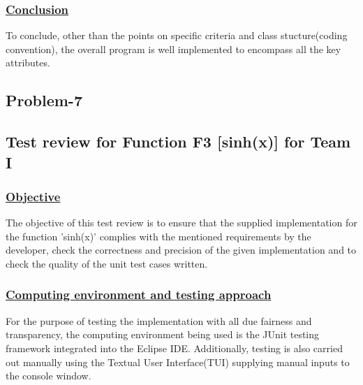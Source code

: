 \documentclass[12pt]{report}
\begin{document}
	\vspace{-0.5cm}\subsubsection{\underline{Conclusion}}To conclude, other than the points on specific criteria and class stucture(coding convention), the overall program is well implemented to encompass all the key attributes.

\begin{center}
	\section{Problem-7}
\end{center}

\subsection{Test review for Function F3 [sinh(x)] for Team I}
\subsubsection{\underline{Objective}}The objective of this test review is to ensure that the supplied implementation for the function 'sinh(x)' complies with the mentioned requirements by the developer, check the correctness and precision of the given implementation and to check the quality of the unit test cases written.
\subsubsection{\underline{Computing environment and testing approach}}For the purpose of testing the implementation with all due fairness and transparency, the computing environment being used is the JUnit testing framework integrated into the Eclipse IDE. Additionally, testing is also carried out manually using the Textual User Interface(TUI) supplying manual inputs to the console window.
\end{document}
